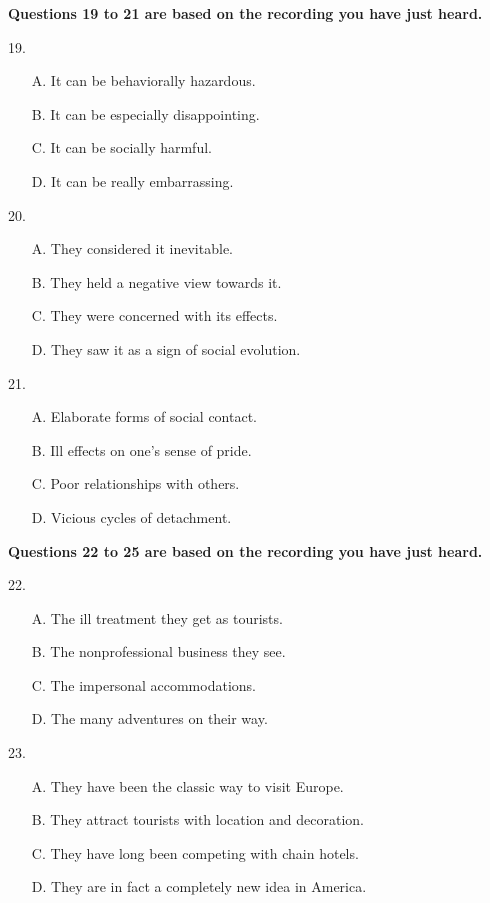 \documentclass[UTF8,11pt]{ctexart}
\begin{document}
\textbf{Questions 19 to 21 are based on the recording you have just heard.}


19.


\begin{itemize}[leftmargin=2em,itemsep=.2em,topsep=.4em]\item[A.] It can be behaviorally hazardous.
\item[B.] It can be especially disappointing.
\item[C.] It can be socially harmful.
\item[D.] It can be really embarrassing.
\end{itemize}

20.


\begin{itemize}[leftmargin=2em,itemsep=.2em,topsep=.4em]\item[A.] They considered it inevitable.
\item[B.] They held a negative view towards it.
\item[C.] They were concerned with its effects.
\item[D.] They saw it as a sign of social evolution.
\end{itemize}

21.


\begin{itemize}[leftmargin=2em,itemsep=.2em,topsep=.4em]\item[A.] Elaborate forms of social contact.
\item[B.] Ill effects on one’s sense of pride.
\item[C.] Poor relationships with others.
\item[D.] Vicious cycles of detachment.
\end{itemize}

\textbf{Questions 22 to 25 are based on the recording you have just heard.}


22.


\begin{itemize}[leftmargin=2em,itemsep=.2em,topsep=.4em]\item[A.] The ill treatment they get as tourists.
\item[B.] The nonprofessional business they see.
\item[C.] The impersonal accommodations.
\item[D.] The many adventures on their way.
\end{itemize}

23.


\begin{itemize}[leftmargin=2em,itemsep=.2em,topsep=.4em]\item[A.] They have been the classic way to visit Europe.
\item[B.] They attract tourists with location and decoration.
\item[C.] They have long been competing with chain hotels.
\item[D.] They are in fact a completely new idea in America.
\end{itemize}
\end{document}
